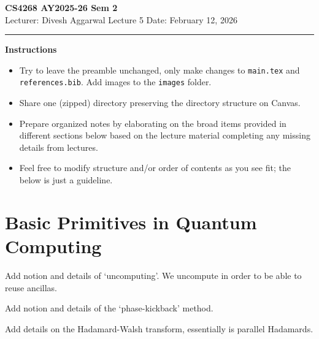 



% 


\newpage
\noindent
\textbf{CS4268 AY2025-26 Sem 2}
\\
\noindent
Lecturer: Divesh Aggarwal
\hfill
Lecture 5                      %
\hfill
Date: February 12, 2026          %


\noindent
\rule{\textwidth}{1pt}

\medskip


\textbf{Instructions}\\
\begin{itemize}
    \item Try to leave the preamble unchanged, only make changes to \texttt{main.tex} and  \texttt{references.bib}. Add images to the \texttt{images} folder. 
    \item Share one (zipped) directory preserving the directory structure on Canvas. 
    \item Prepare organized notes by elaborating on the broad items provided in different sections below based on the lecture material completing any missing details from lectures.
    \item Feel free to modify structure and/or order of contents as you see fit; the below is just a guideline.
\end{itemize} 


\section{Basic Primitives in Quantum Computing}

Add notion and details of `uncomputing'. We uncompute in order to be able to reuse ancillas.

Add notion and details of the `phase-kickback' method.

Add details on the Hadamard-Walsh transform, essentially is parallel Hadamards.







% 
% 
% 

